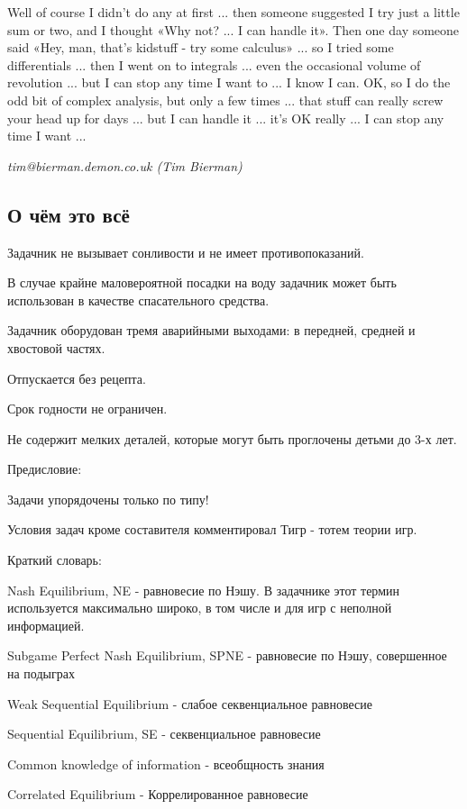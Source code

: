 Well of course I didn't do any at first ... then someone suggested I try just a little sum or two, and I thought «Why not? ... I can handle it». Then one day someone said «Hey, man, that's kidstuff - try some calculus» ... so I tried some differentials ... then I went on to integrals ... even the occasional volume of revolution ... but I can stop any time I want to ... I know I can. OK, so I do the odd bit of complex analysis, but only a few times ... that stuff can really screw your head up for days ... but I can handle it ... it's OK really ... I can stop any time I want ...\par
{\it tim@bierman.demon.co.uk (Tim Bierman)}\par

\vspace{0.5cm}

\subsection{О чём это всё}

Задачник не вызывает сонливости и не имеет противопоказаний.\par
В случае крайне маловероятной посадки на воду задачник может быть использован в качестве спасательного средства. \par
Задачник оборудован тремя аварийными выходами: в передней, средней и хвостовой частях.\par
Отпускается без рецепта.\par
Срок годности не ограничен.\par
Не содержит мелких деталей, которые могут быть проглочены детьми до 3-х лет.\par
\vspace{0.5cm}
{\bf }Предисловие:\par
Задачи упорядочены только по типу!\par

Условия задач кроме составителя комментировал Тигр - тотем теории игр.\par


Краткий словарь:\par
Nash Equilibrium, NE - равновесие по Нэшу. В задачнике этот термин используется максимально широко, в том числе и для игр с неполной информацией.\par
Subgame Perfect Nash Equilibrium, SPNE - равновесие по Нэшу,  совершенное на подыграх\par
Weak Sequential Equilibrium - слабое секвенциальное равновесие \par
Sequential Equilibrium, SE - секвенциальное равновесие\par
Common knowledge of information - всеобщность знания\par
Correlated Equilibrium - Коррелированное равновесие\par

